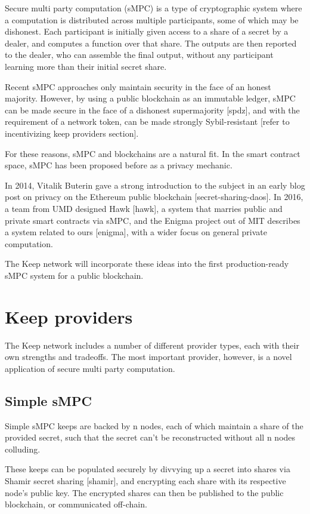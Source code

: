 \documentclass[11pt]{article}
\begin{document}
Secure multi party computation (sMPC) is a type of cryptographic
system where a computation is distributed across multiple
participants, some of which may be dishonest. Each participant is
initially given access to a share of a secret by a dealer, and
computes a function over that share. The outputs are then reported to
the dealer, who can assemble the final output, without any participant
learning more than their initial secret share.

Recent sMPC approaches only maintain security in the face of an honest
majority. However, by using a public blockchain as an immutable
ledger, sMPC can be made secure in the face of a dishonest
supermajority [spdz], and with the requirement of a network token, can
be made strongly Sybil-resistant [refer to incentivizing keep
providers section].

For these reasons, sMPC and blockchains are a natural fit. In the
smart contract space, sMPC has been proposed before as a privacy
mechanic.

In 2014, Vitalik Buterin gave a strong introduction to the subject in
an early blog post on privacy on the Ethereum public blockchain
[secret-sharing-daos]. In 2016, a team from UMD designed Hawk [hawk],
a system that marries public and private smart contracts via sMPC, and
the Enigma project out of MIT describes a system related to ours
[enigma], with a wider focus on general private computation.

The Keep network will incorporate these ideas into the first
production-ready sMPC system for a public blockchain.

\section{Keep providers}

The Keep network includes a number of different provider types, each
with their own strengths and tradeoffs. The most important provider,
however, is a novel application of secure multi party computation.

\subsection{Simple sMPC}

Simple sMPC keeps are backed by n nodes, each of which maintain a
share of the provided secret, such that the secret can’t be
reconstructed without all n nodes colluding.

These keeps can be populated securely by divvying up a secret into
shares via Shamir secret sharing [shamir], and encrypting each share
with its respective node’s public key. The encrypted shares can then
be published to the public blockchain, or communicated off-chain.
\end{document}
